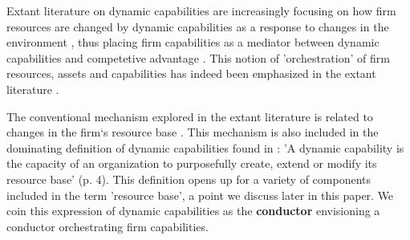 Extant literature on dynamic capabilities are increasingly focusing on how firm resources
are changed by dynamic capabilities as a response to changes in the environment
\citep{Schilke2018,Eriksson2014}, thus placing firm capabilities as a mediator between
dynamic capabilities and competetive advantage \citep{Helfat2007}. This notion of
'orchestration' of firm resources, assets and capabilities has indeed been emphasized in
the extant literature \citep{Sirmon2011,Helfat2015}. 





The conventional mechanism explored in the extant literature is related to changes in the
firm`s resource base \citep{Eriksson2014,Schilke2018}. This mechanism is also included in
the dominating definition of dynamic capabilities found in \citep{Helfat2007}: 'A dynamic
capability is the capacity of an organization to purposefully create, extend or modify its
resource base' (p. 4). This definition opens up for a variety of components
included in the term 'resource base', a point we discuss later in this paper. We coin this
expression of dynamic capabilities as the {\bf conductor} envisioning a conductor
orchestrating firm capabilities.

